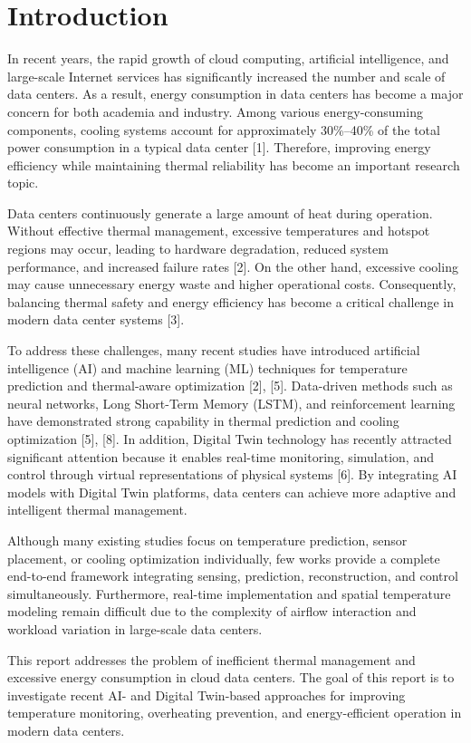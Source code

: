 \documentclass[conference]{IEEEtran}
\begin{document}
\section{Introduction}
    In recent years, the rapid growth of cloud computing, artificial intelligence, and large-scale Internet services has significantly increased the number and scale of data centers. As a result, energy consumption in data centers has become a major concern for both academia and industry. Among various energy-consuming components, cooling systems account for approximately 30\%--40\% of the total power consumption in a typical data center [1]. Therefore, improving energy efficiency while maintaining thermal reliability has become an important research topic.

Data centers continuously generate a large amount of heat during operation. Without effective thermal management, excessive temperatures and hotspot regions may occur, leading to hardware degradation, reduced system performance, and increased failure rates [2]. On the other hand, excessive cooling may cause unnecessary energy waste and higher operational costs. Consequently, balancing thermal safety and energy efficiency has become a critical challenge in modern data center systems [3].

To address these challenges, many recent studies have introduced artificial intelligence (AI) and machine learning (ML) techniques for temperature prediction and thermal-aware optimization [2], [5]. Data-driven methods such as neural networks, Long Short-Term Memory (LSTM), and reinforcement learning have demonstrated strong capability in thermal prediction and cooling optimization [5], [8]. In addition, Digital Twin technology has recently attracted significant attention because it enables real-time monitoring, simulation, and control through virtual representations of physical systems [6]. By integrating AI models with Digital Twin platforms, data centers can achieve more adaptive and intelligent thermal management.

Although many existing studies focus on temperature prediction, sensor placement, or cooling optimization individually, few works provide a complete end-to-end framework integrating sensing, prediction, reconstruction, and control simultaneously. Furthermore, real-time implementation and spatial temperature modeling remain difficult due to the complexity of airflow interaction and workload variation in large-scale data centers.

This report addresses the problem of inefficient thermal management and excessive energy consumption in cloud data centers. The goal of this report is to investigate recent AI- and Digital Twin-based approaches for improving temperature monitoring, overheating prevention, and energy-efficient operation in modern data centers.
\end{document}
